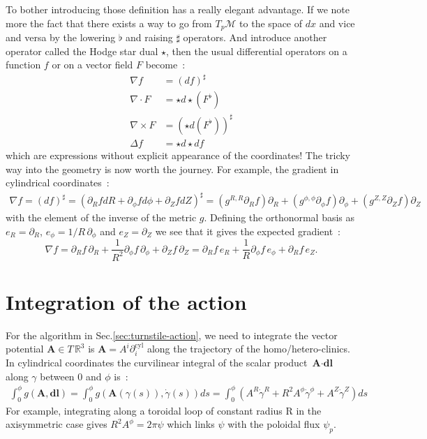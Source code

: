 To bother introducing those definition has a really elegant advantage. If we note more the fact that there exists a way to go from $T_p\mathcal{M}$ to the space of $dx$ and vice and versa by the lowering $\flat$ and raising $\sharp$ operators. And introduce another operator called the Hodge star dual $\star$, then the usual differential operators on a function $f$ or on a vector field $F$ become~:
\begin{align*}
    \nabla f &= (df)^\sharp\\
    \nabla\cdot F &= \star d \star (F^\flat)\\
    \nabla\times F &= (\star d (F^\flat))^\sharp\\
    \Delta f &= \star d \star d f
\end{align*}
which are expressions without explicit appearance of the coordinates! The tricky way into the geometry is now worth the journey. For example, the gradient in cylindrical coordinates~:
\begin{align*}
    \nabla f = (df)^\sharp = (\partial_RfdR + \partial_\phi fd\phi + \partial_ZfdZ)^\sharp = (g^{R,R}\partial_Rf)\partial_R + (g^{\phi,\phi}\partial_\phi f)\partial_\phi + (g^{Z,Z}\partial_Zf)\partial_Z
\end{align*}
with the element of the inverse of the metric $g$. Defining the orthonormal basis as $e_R = \partial_R$, $e_\phi = 1/R\,\partial_\phi$ and $e_Z = \partial_Z$ we see that it gives the expected gradient~:
\begin{equation*}
    \nabla f = \partial_Rf\,\partial_R + \frac{1}{R^2}\partial_\phi f\,\partial_\phi + \partial_Zf\,\partial_Z = \partial_Rf\,e_R+ \frac{1}{R}\partial_\phi f\,e_\phi + \partial_Rf\,e_Z.
\end{equation*}

\section{Integration of the action}

For the algorithm in Sec.\ref{sec:turnstile-action}, we need to integrate the vector potential $\textbf{A} \in T\,\mathbb{R}^3$ is $\textbf{A} =  A^i\partial_i^\text{cyl}$ along the trajectory of the homo/hetero-clinics. In cylindrical coordinates the curvilinear integral of the scalar product $\textbf{A}\cdot\textbf{dl}$ along $\gamma$ between $0$ and $\phi$ is~:
\begin{align*}
    \int_0^\phi g(\textbf{A},\textbf{dl}) = \int_0^\phi g(\textbf{A}(\gamma(s)),\dot{\gamma}(s))ds = \int_0^\phi (A^R\dot{\gamma}^R + R^2A^\phi\dot{\gamma}^\phi + A^Z\dot{\gamma}^Z) ds
\end{align*}
For example, integrating along a toroidal loop of constant radius R in the axisymmetric case gives $R^2A^\phi = 2\pi\psi$ which links $\psi$ with the poloidal flux $\psi_p$.

